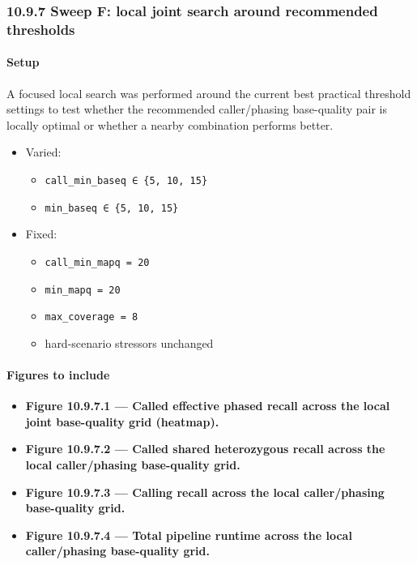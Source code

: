\documentclass[
]{article}
\providecommand{\tightlist}{%
  \setlength{\itemsep}{0pt}\setlength{\parskip}{0pt}}
\begin{document}
\subsubsection{10.9.7 Sweep F: local joint search around recommended
thresholds}\label{sweep-f-local-joint-search-around-recommended-thresholds}

\paragraph{Setup}\label{setup-13}

A focused local search was performed around the current best practical
threshold settings to test whether the recommended caller/phasing
base-quality pair is locally optimal or whether a nearby combination
performs better.

\begin{itemize}
\tightlist
\item
  Varied:

  \begin{itemize}
  \tightlist
  \item
    \texttt{call\_min\_baseq\ ∈\ \{5,\ 10,\ 15\}}
  \item
    \texttt{min\_baseq\ ∈\ \{5,\ 10,\ 15\}}
  \end{itemize}
\item
  Fixed:

  \begin{itemize}
  \tightlist
  \item
    \texttt{call\_min\_mapq\ =\ 20}
  \item
    \texttt{min\_mapq\ =\ 20}
  \item
    \texttt{max\_coverage\ =\ 8}
  \item
    hard-scenario stressors unchanged
  \end{itemize}
\end{itemize}

\paragraph{Figures to include}\label{figures-to-include-13}

\begin{itemize}
\tightlist
\item
  \textbf{Figure 10.9.7.1 --- Called effective phased recall across the
  local joint base-quality grid (heatmap).}
\item
  \textbf{Figure 10.9.7.2 --- Called shared heterozygous recall across
  the local caller/phasing base-quality grid.}
\item
  \textbf{Figure 10.9.7.3 --- Calling recall across the local
  caller/phasing base-quality grid.}
\item
  \textbf{Figure 10.9.7.4 --- Total pipeline runtime across the local
  caller/phasing base-quality grid.}
\end{itemize}
\end{document}
